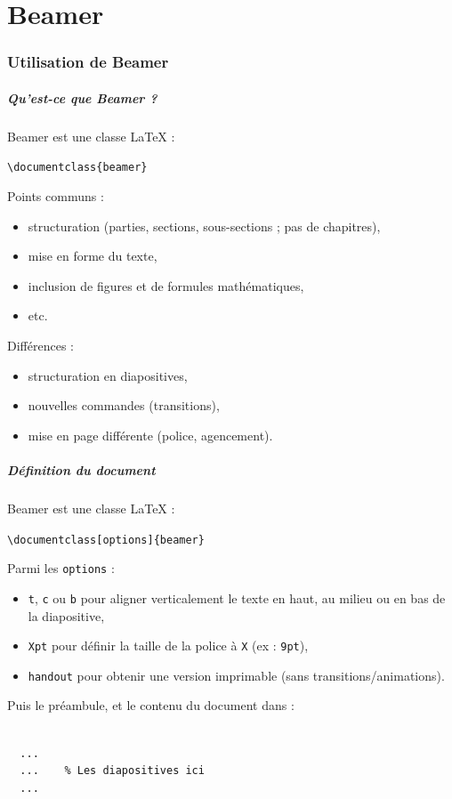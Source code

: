
\part{Beamer}

\section{Utilisation de Beamer}

\begin{frame}[fragile]
  \frametitle{Qu'est-ce que Beamer ?}

Beamer est une classe \LaTeX{} :

\lstinline?\documentclass{beamer}?

\medskip
Points communs :
\begin{itemize}
  \item structuration (parties, sections, sous-sections ; pas de chapitres),
  \item mise en forme du texte,
  \item inclusion de figures et de formules mathématiques,
  \item etc.
\end{itemize}

\medskip
Différences :
\begin{itemize}
  \item structuration en diapositives,
  \item nouvelles commandes (transitions),
  \item mise en page différente (police, agencement).
\end{itemize}
\end{frame}



\begin{frame}[fragile]
  \frametitle{Définition du document}

Beamer est une classe \LaTeX{} :

\lstinline?\documentclass[options]{beamer}?

\medskip
Parmi les \lstinline?options? :
\begin{itemize}
  \item \lstinline?t?, \lstinline?c? ou \lstinline?b? pour aligner verticalement le texte en haut, au milieu ou en bas de la diapositive,
  \item \lstinline?Xpt? pour définir la taille de la police à \lstinline?X? (ex : \lstinline?9pt?),
  \item \lstinline?handout? pour obtenir une version imprimable (sans transitions/animations).
\end{itemize}

\medskip
Puis le préambule, et le contenu du document dans :
\begin{lstlisting}

  ...
  ...    % Les diapositives ici
  ...

\end{lstlisting}
\end{frame}



